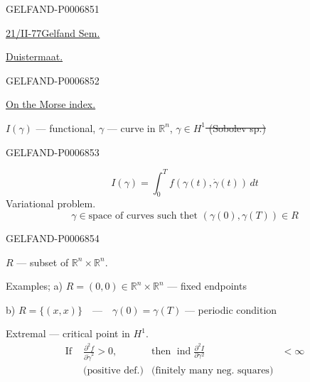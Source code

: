 \begin{GelfandAdjacentEvidence}{GELFAND-P000685}{1}

\underline{21/II-77}\qquad \underline{Gelfand Sem.}

\underline{Duistermaat.}
\end{GelfandAdjacentEvidence}
\begin{GelfandAdjacentEvidence}{GELFAND-P000685}{2}


\underline{On the Morse index.}

\(I(\gamma)\) --- functional, \(\gamma\) --- curve in \(\mathbb R^n\),
\sout{\(\gamma\in H^1\) (Sobolev sp.)}
\end{GelfandAdjacentEvidence}
\begin{GelfandAdjacentEvidence}{GELFAND-P000685}{3}

\[
I(\gamma)=\int_0^T f(\gamma(t),\dot\gamma(t))\,dt
\]
Variational problem.
\[
\gamma\in\text{space of curves such thet }(\gamma(0),\gamma(T))\in R
\]
\end{GelfandAdjacentEvidence}
\begin{GelfandAdjacentEvidence}{GELFAND-P000685}{4}


\(R\) --- subset of \(\mathbb R^n\times\mathbb R^n\).

Examples; a) \(R=(0,0)\in\mathbb R^n\times\mathbb R^n\) --- fixed endpoints

b) \(R=\{(x,x)\}\quad\text{---}\quad\gamma(0)=\gamma(T)\) --- periodic condition
\end{GelfandAdjacentEvidence}


Extremal --- critical point in \(H^1\).
\[
\begin{aligned}
\text{If }&\frac{\partial^2 f}{\partial\dot\gamma^2}>0,
&\text{then }\operatorname{ind}\frac{\partial^2 I}{\partial\gamma^2}&<\infty\\
&\text{(positive def.)}
&\text{(finitely many neg. squares)}&
\end{aligned}
\]


